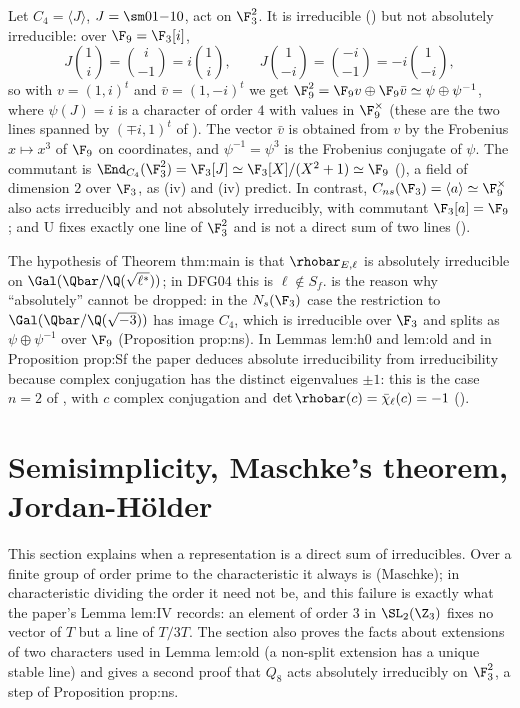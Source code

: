 \begin{example}[$C_4$ on $\F_3^2$]\label{ex:reps:c4}
Let $C_4=\langle J\rangle$, $J=\sm01{-1}0$, act on $\F_3^2$. It is irreducible () but not absolutely irreducible: over
$\F_9=\F_3[i]$,
\[
J\binom1i=\binom{i}{-1}=i\binom1i,\qquad J\binom1{-i}=\binom{-i}{-1}=-i\binom1{-i},
\]
so with $v=(1,i)^t$ and $\bar v=(1,-i)^t$ we get $\F_9^2=\F_9v\oplus\F_9\bar v\simeq\psi\oplus\psi^{-1}$, where $\psi(J)=i$ is a character of order $4$ with values
in $\F_9^\times$ (these are the two lines spanned by $(\mp i,1)^t$ of ). The vector $\bar v$ is obtained from $v$ by the Frobenius
$x\mapsto x^3$ of $\F_9$ on coordinates, and $\psi^{-1}=\psi^3$ is the Frobenius conjugate of $\psi$. The commutant is $\End_{C_4}(\F_3^2)=\F_3[J]\simeq\F_3[X]/(X^2+1)\simeq\F_9$
(), a field of dimension $2$ over $\F_3$, as (iv) and (iv) predict.
In contrast, $C_{ns}(\F_3)=\langle a\rangle\simeq\F_9^\times$ also acts irreducibly and not absolutely irreducibly, with commutant $\F_3[a]=\F_9$; and $\mathrm U$
fixes exactly one line of $\F_3^2$ and is not a direct sum of two lines ().
\end{example}

\begin{paperlink}
The hypothesis of Theorem thm:main is that $\rhobar_{E,\ell}$ is absolutely irreducible on $\Gal(\Qbar/\Q(\sqrt{\ell^*}))$; in DFG04 this is $\ell\notin S_f$.
 is the reason why ``absolutely'' cannot be dropped: in the $N_s(\F_3)$ case the restriction to $\Gal(\Qbar/\Q(\sqrt{-3}))$ has
image $C_4$, which is irreducible over $\F_3$ and splits as $\psi\oplus\psi^{-1}$ over $\F_9$ (Proposition prop:ns). In Lemmas lem:h0 and lem:old and in
Proposition prop:Sf the paper deduces absolute irreducibility from irreducibility because complex conjugation has the distinct
eigenvalues $\pm1$: this is the case $n=2$ of , with $c$ complex conjugation and $\det\rhobar(c)=\bar\chi_\ell(c)=-1$
().
\end{paperlink}

\section{Semisimplicity, Maschke's theorem, Jordan-H\"older}\label{sec:reps:semisimple}

This section explains when a representation is a direct sum of irreducibles. Over a finite group of order prime to the
characteristic it always is (Maschke); in characteristic dividing the order it need not be, and this failure is exactly what the
paper's Lemma lem:IV records: an element of order $3$ in $\SL_2(\Z_3)$ fixes no vector of $T$ but a line of $T/3T$. The section also
proves the facts about extensions of two characters used in Lemma lem:old (a non-split extension has a unique stable line) and
gives a second proof that $Q_8$ acts absolutely irreducibly on $\F_3^2$, a step of Proposition prop:ns.


